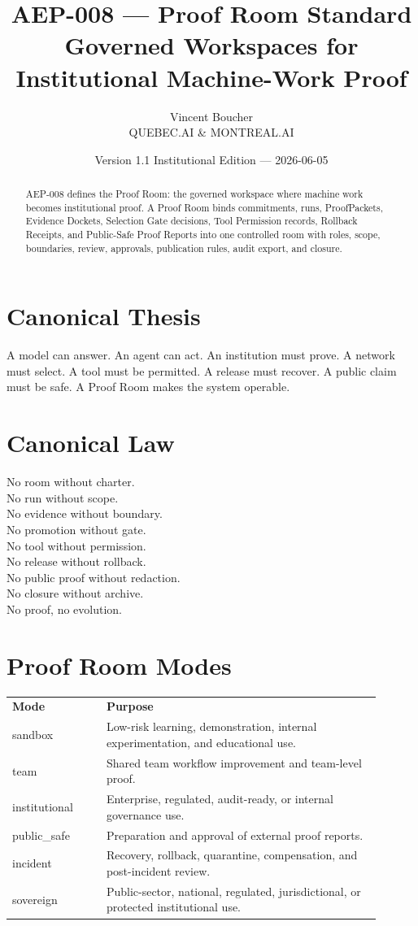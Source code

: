 \documentclass[11pt]{article}
\title{\textbf{AEP-008 --- Proof Room Standard}\\\large Governed Workspaces for Institutional Machine-Work Proof}
\author{Vincent Boucher\\QUEBEC.AI \& MONTREAL.AI}
\date{Version 1.1 Institutional Edition --- 2026-06-05}
\begin{document}
\maketitle

\begin{abstract}
AEP-008 defines the Proof Room: the governed workspace where machine work becomes institutional proof. A Proof Room binds commitments, runs, ProofPackets, Evidence Dockets, Selection Gate decisions, Tool Permission records, Rollback Receipts, and Public-Safe Proof Reports into one controlled room with roles, scope, boundaries, review, approvals, publication rules, audit export, and closure.
\end{abstract}

\section*{Canonical Thesis}
A model can answer. An agent can act. An institution must prove. A network must select. A tool must be permitted. A release must recover. A public claim must be safe. A Proof Room makes the system operable.

\section*{Canonical Law}
No room without charter.\\
No run without scope.\\
No evidence without boundary.\\
No promotion without gate.\\
No tool without permission.\\
No release without rollback.\\
No public proof without redaction.\\
No closure without archive.\\
No proof, no evolution.

\section{Proof Room Modes}
\begin{longtable}{p{0.23\linewidth}p{0.67\linewidth}}
\textbf{Mode} & \textbf{Purpose}\\
sandbox & Low-risk learning, demonstration, internal experimentation, and educational use.\\
team & Shared team workflow improvement and team-level proof.\\
institutional & Enterprise, regulated, audit-ready, or internal governance use.\\
public\_safe & Preparation and approval of external proof reports.\\
incident & Recovery, rollback, quarantine, compensation, and post-incident review.\\
sovereign & Public-sector, national, regulated, jurisdictional, or protected institutional use.\\
\end{longtable}
\end{document}
